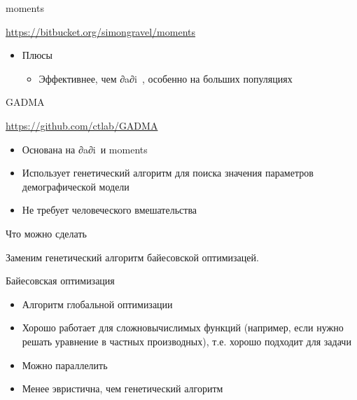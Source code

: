 \documentclass[
  russian,
  ignorenonframetext,
]{beamer}
\providecommand{\tightlist}{%
  \setlength{\itemsep}{0pt}\setlength{\parskip}{0pt}}
\begin{document}
\begin{frame}{moments}
\protect\hypertarget{moments}{}

\url{https://bitbucket.org/simongravel/moments}

\begin{itemize}
\tightlist
\item
  Плюсы

  \begin{itemize}
  \tightlist
  \item
    Эффективнее, чем ∂a∂i\ , особенно на больших популяциях
  \end{itemize}
\end{itemize}

\end{frame}

\begin{frame}{GADMA}
\protect\hypertarget{gadma}{}

\url{https://github.com/ctlab/GADMA}

\begin{itemize}
\tightlist
\item
  Основана на ∂a∂i\ и moments
\item
  Использует генетический алгоритм для поиска значения параметров
  демографической модели
\item
  Не требует человеческого вмешательства
\end{itemize}

\end{frame}

\begin{frame}[standout]{Что можно сделать}
\protect\hypertarget{ux447ux442ux43e-ux43cux43eux436ux43dux43e-ux441ux434ux435ux43bux430ux442ux44c}{}

Заменим генетический алгоритм байесовской оптимизацей.

\end{frame}

\begin{frame}{Байесовская оптимизация}
\protect\hypertarget{ux431ux430ux439ux435ux441ux43eux432ux441ux43aux430ux44f-ux43eux43fux442ux438ux43cux438ux437ux430ux446ux438ux44f}{}

\begin{itemize}
\tightlist
\item
  Алгоритм глобальной оптимизации
\item
  Хорошо работает для сложновычислимых функций (например, если нужно
  решать уравнение в частных производных), т.е. хорошо подходит для
  задачи
\item
  Можно параллелить
\item
  Менее эвристична, чем генетический алгоритм
\end{itemize}

\end{frame}
\end{document}
